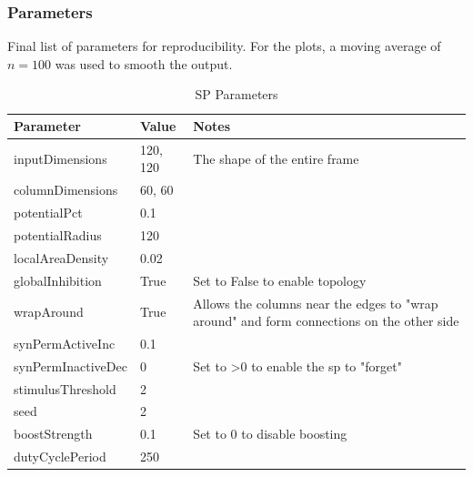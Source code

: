 \subsubsection{Parameters}
Final list of parameters for reproducibility. For the plots, a moving average of $n=100$ was used to smooth the output.
\begin{table}[H]
    \centering
    \begin{tabularx}{\linewidth}{@{}llX@{}}
        \toprule
        \textbf{Parameter} & \textbf{Value} & \textbf{Notes}                                             \\
        \midrule
        inputDimensions    & 120, 120       & The shape of the entire frame                              \\
        columnDimensions   & 60, 60         &                                                            \\
        potentialPct       & 0.1            &                                                            \\
        potentialRadius    & 120            &                                                            \\
        localAreaDensity   & 0.02           &                                                            \\
        globalInhibition   & True           & Set to False to enable topology                            \\
        wrapAround         & True           &
        Allows the columns near the edges to "wrap around" and form connections on the other side        \\
        synPermActiveInc   & 0.1            &                                                            \\
        synPermInactiveDec & 0              & Set to \textgreater{}0 to enable the \gls*{sp} to "forget" \\
        stimulusThreshold  & 2              &                                                            \\
        seed               & 2              &                                                            \\
        boostStrength      & 0.1            & Set to 0 to disable boosting                               \\
        dutyCyclePeriod    & 250            &                                                            \\
        \bottomrule
    \end{tabularx}

    \caption{SP Parameters}
    \label{tab:bb_sp_params}
\end{table}
